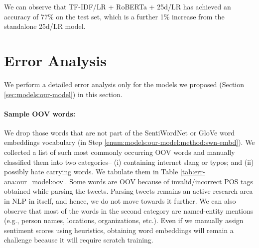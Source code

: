 We can observe that \ac{TF-IDF}/\ac{LR} + \ac{RoBERTa} + 25d/\ac{LR} has achieved an accuracy of 77\% on the test set, which is a further 1\% increase from the standalone 25d/\ac{LR} model.

\section{Error Analysis}
\label{sec:results:err-ana}

We perform a detailed error analysis only for the models we proposed (Section \ref{sec:models:our-model}) in this section.


\paragraph{Sample OOV words:}
We drop those words that are not part of the SentiWordNet or \ac{GloVe} word embeddings vocabulary (in Step \ref{enum:models:our-model:method:swn-embd}). We collected a list of such most commonly occurring OOV words and manually classified them into two categories-- (i) containing internet slang or typos; and (ii) possibly hate carrying words. We tabulate them in Table \ref{tab:err-ana:our_model:oov}.
Some words are OOV because of invalid/incorrect POS tags obtained while parsing the tweets. Parsing tweets remains an active research area in NLP in itself, and hence, we do not move towards it further. We can also observe that most of the words in the second category are named-entity mentions (e.g., person names, locations, organizations, etc.). Even if we manually assign sentiment scores using heuristics, obtaining word embeddings will remain a challenge because it will require scratch training.


